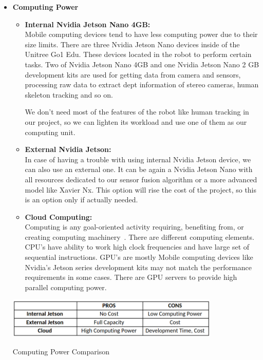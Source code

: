 \documentclass[12pt]{article}
\begin{document}
    \begin{itemize}
        \item \textbf{Computing Power}
            \begin{itemize}
                \item \textbf{Internal Nvidia Jetson Nano 4GB:} \\
                Mobile computing devices tend to have less computing power due to their size limits. There are three Nvidia Jetson Nano devices inside of the Unitree Go1 Edu. These devices located in the robot to perform certain tasks. Two of Nvidia Jetson Nano 4GB and one Nvidia Jetson Nano 2 GB development kits are used for getting data from camera and sensors, processing raw data to extract dept information of stereo cameras, human skeleton tracking and so on. 

                We don’t need most of the features of the robot like human tracking in our project, so we can lighten its workload and use one of them as our computing unit. 

                \item \textbf{External Nvidia Jetson:} \\
                In case of having a trouble with using internal Nvidia Jetson device, we can also use an external one. It can be again a Nvidia Jetson Nano with all resources dedicated to our sensor fusion algorithm or a more advanced model like Xavier Nx. This option will rise the cost of the project, so this is an option only if actually needed. 
            
                \item \textbf{Cloud Computing:} \\
                Computing is any goal-oriented activity requiring, benefiting from, or creating computing machinery~\cite{enwiki:1120224488}. There are different computing elements. CPU’s have ability to work high clock frequencies and have large set of sequential instructions. GPU’s are mostly  Mobile computing devices like Nvidia’s Jetson series development kits may not match the performance requirements in some cases. There are GPU servers to provide high parallel computing power.
                
            \end{itemize}

            \vspace{10pt}

            \begin{table}[H]
                \centering
                \includegraphics[width=0.8\textwidth]{ComputerComparison.png}
                \caption{Computing Power Comparison}
            \end{table}


\end{itemize}
\end{document}
